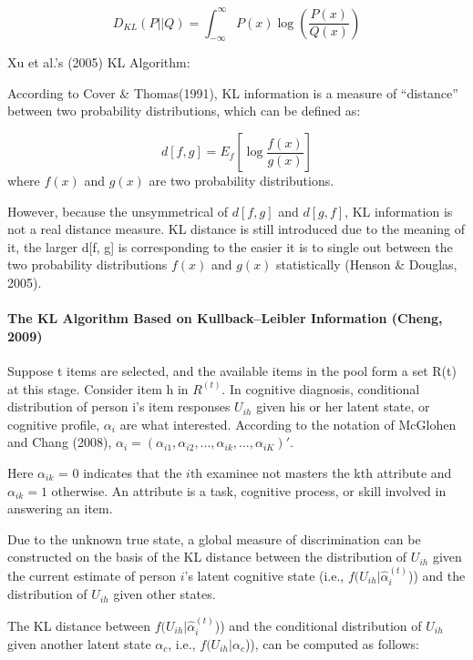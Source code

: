 \documentclass[
]{article}
\begin{document}
\[D_{KL}(P||Q)=\int_{-\infty}^{\infty} P(x)\log\left(\frac {P(x)}{Q(x)}\right)\]

Xu et al.'s (2005) KL Algorithm:

According to Cover \& Thomas(1991), KL information is a measure of
``distance'' between two probability distributions, which can be defined
as:

\[d[f,g]=E_f\left[\log \frac{f(x)}{g(x)}\right]\] where \(f(x)\) and
\(g(x)\) are two probability distributions.

However, because the unsymmetrical of \(d[f, g]\) and \(d[g, f]\), KL
information is not a real distance measure. KL distance is still
introduced due to the meaning of it, the larger d{[}f, g{]} is
corresponding to the easier it is to single out between the two
probability distributions \(f(x)\) and \(g(x)\) statistically (Henson \&
Douglas, 2005).

\hypertarget{the-kl-algorithm-based-on-kullbackleibler-information-cheng-2009}{%
\paragraph{The KL Algorithm Based on Kullback--Leibler Information
(Cheng,
2009)}\label{the-kl-algorithm-based-on-kullbackleibler-information-cheng-2009}}

Suppose t items are selected, and the available items in the pool form a
set R(t) at this stage. Consider item h in \(R^{(t)}\). In cognitive
diagnosis, conditional distribution of person i's item responses
\(U_{ih}\) given his or her latent state, or cognitive profile,
\(\alpha_i\) are what interested. According to the notation of McGlohen
and Chang (2008),
\(\alpha_{i}=(\alpha_{i1},\alpha_{i2},...,\alpha_{ik},...,\alpha_{iK})'\).

Here \(\alpha_{ik}\) = 0 indicates that the \(i\)th examinee not masters
the kth attribute and \(\alpha_{ik} = 1\) otherwise. An attribute is a
task, cognitive process, or skill involved in answering an item.

Due to the unknown true state, a global measure of discrimination can be
constructed on the basis of the KL distance between the distribution of
\(U_{ih}\) given the current estimate of person \(i\)'s latent cognitive
state (i.e., \(f(U_{ih}|\hat \alpha_i^{(t)}\))) and the distribution of
\(U_{ih}\) given other states.

The KL distance between \(f(U_{ih}|\hat \alpha_i^{(t)}\))) and the
conditional distribution of \(U_{ih}\) given another latent state
\(\alpha_c\), i.e., \(f(U_{ih}|\alpha_c\))), can be computed as follows:
\end{document}
